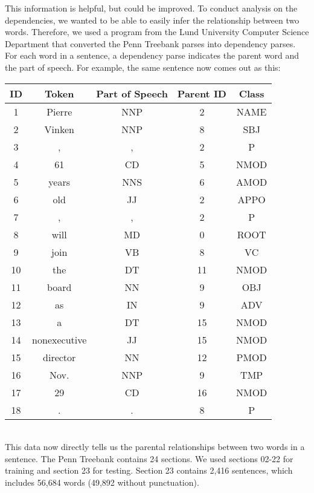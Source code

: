 \documentclass[12pt,fleqn]{amsart}
\begin{document}
This information is helpful, but could be improved. To conduct analysis on the dependencies, we wanted to be able to easily infer the relationship between two words. Therefore, we used a program from the Lund University Computer Science Department that converted the Penn Treebank parses into dependency parses. For each word in a sentence, a dependency parse indicates the parent word and the part of speech. For example, the same sentence now comes out as this:
\\

        \begin{tabular}{|ccccc|}
            ID & Token & Part of Speech & Parent ID & Class \\ 
            \hline
            1 &Pierre & NNP & 2 & NAME \\
            2 & Vinken & NNP & 8 & SBJ\\
            3 & , & , & 2 & P\\
            4 & 61 & CD & 5 & NMOD\\
            5 & years & NNS & 6 & AMOD\\
            6 & old & JJ & 2 & APPO\\
            7 & , & , & 2 & P\\
            8 & will & MD & 0 & ROOT\\
            9 & join & VB & 8 & VC\\
            10 & the & DT & 11 & NMOD\\
            11 & board & NN & 9 & OBJ\\
            12 & as & IN & 9 & ADV\\
            13 & a & DT & 15 & NMOD\\
            14 & nonexecutive & JJ & 15 & NMOD\\
            15 & director & NN & 12 & PMOD\\
            16 & Nov. & NNP & 9 & TMP\\
            17 & 29 & CD & 16 & NMOD\\
            18 & . & . & 8 & P\\
            \hline
        \end{tabular} \\


This data now directly tells us the parental relationships between two words in a sentence. The Penn Treebank contains 24 sections. We used sections 02-22 for training and section 23 for testing. Section 23 contains 2,416 sentences, which includes 56,684 words (49,892 without punctuation).
\end{document}
